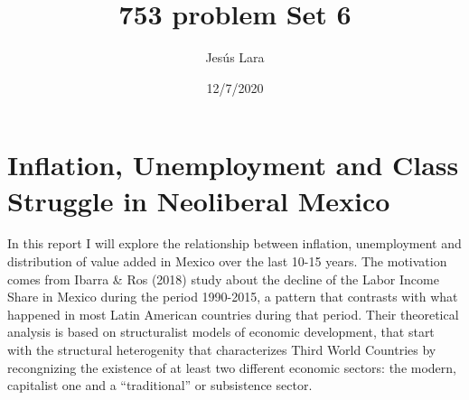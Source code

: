 \documentclass[
]{article}
\title{753 problem Set 6}
\author{Jesús Lara}
\date{12/7/2020}
\begin{document}
\maketitle

\hypertarget{inflation-unemployment-and-class-struggle-in-neoliberal-mexico}{%
\section{Inflation, Unemployment and Class Struggle in Neoliberal
Mexico}\label{inflation-unemployment-and-class-struggle-in-neoliberal-mexico}}

In this report I will explore the relationship between inflation,
unemployment and distribution of value added in Mexico over the last
10-15 years. The motivation comes from Ibarra \& Ros (2018) study about
the decline of the Labor Income Share in Mexico during the period
1990-2015, a pattern that contrasts with what happened in most Latin
American countries during that period. Their theoretical analysis is
based on structuralist models of economic development, that start with
the structural heterogenity that characterizes Third World Countries by
recongnizing the existence of at least two different economic sectors:
the modern, capitalist one and a ``traditional'' or subsistence sector.
\end{document}
